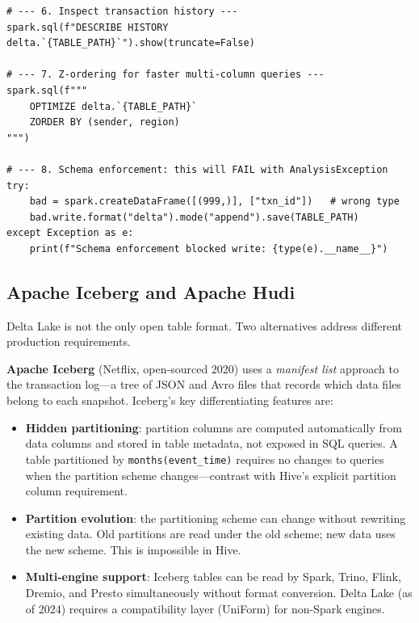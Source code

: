 \begin{lstlisting}[style=pyspark, caption={Delta Lake core operations in PySpark}]
# --- 6. Inspect transaction history ---
spark.sql(f"DESCRIBE HISTORY delta.`{TABLE_PATH}`").show(truncate=False)

# --- 7. Z-ordering for faster multi-column queries ---
spark.sql(f"""
    OPTIMIZE delta.`{TABLE_PATH}`
    ZORDER BY (sender, region)
""")

# --- 8. Schema enforcement: this will FAIL with AnalysisException
try:
    bad = spark.createDataFrame([(999,)], ["txn_id"])   # wrong type
    bad.write.format("delta").mode("append").save(TABLE_PATH)
except Exception as e:
    print(f"Schema enforcement blocked write: {type(e).__name__}")
\end{lstlisting}

\subsection{Apache Iceberg and Apache Hudi}
\label{subsec:iceberg-hudi}

Delta Lake is not the only open table format. Two alternatives address
different production requirements.

\textbf{Apache Iceberg} (Netflix, open-sourced 2020) uses a \emph{manifest
list} approach to the transaction log---a tree of JSON and Avro files
that records which data files belong to each snapshot. Iceberg's key
differentiating features are:
\begin{itemize}
  \item \textbf{Hidden partitioning}: partition columns are computed
        automatically from data columns and stored in table metadata,
        not exposed in SQL queries. A table partitioned by
        \texttt{months(event\_time)} requires no changes to queries
        when the partition scheme changes---contrast with Hive's explicit
        partition column requirement.
  \item \textbf{Partition evolution}: the partitioning scheme can change
        without rewriting existing data. Old partitions are read under the
        old scheme; new data uses the new scheme. This is impossible in Hive.
  \item \textbf{Multi-engine support}: Iceberg tables can be read by
        Spark, Trino, Flink, Dremio, and Presto simultaneously without
        format conversion. Delta Lake (as of 2024) requires a compatibility
        layer (UniForm) for non-Spark engines.
\end{itemize}

